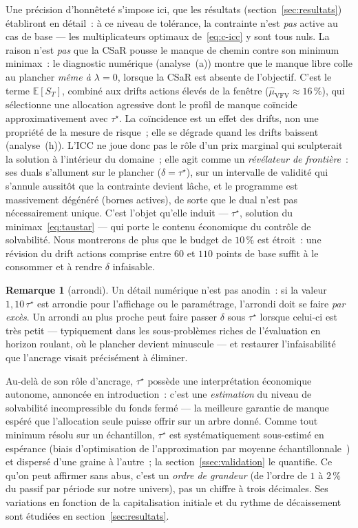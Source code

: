 \documentclass[11pt,letterpaper]{article}
\newcommand{\E}{\mathbb{E}}
\newcommand{\taustar}{\tau^{\star}}
\theoremstyle{definition}
\newtheorem{remarque}{Remarque}
\begin{document}
Une précision d'honnêteté s'impose ici, que les résultats
(section~\ref{sec:resultats}) établiront en détail~: à ce niveau de tolérance,
la contrainte n'est \emph{pas} active au cas de base --- les multiplicateurs
optimaux de~\eqref{eq:c-icc} y sont tous nuls. La raison n'est \emph{pas} que la
CSaR pousse le manque de chemin contre son minimum minimax~: le diagnostic
numérique (analyse~(a)) montre que le manque libre colle au plancher
\emph{même à $\lambda = 0$}, lorsque la CSaR est absente de l'objectif. C'est le
terme $\E[S_T]$, combiné aux drifts actions élevés de la fenêtre
($\hat\mu_{\mathrm{VFV}} \approx 16\,\%$), qui sélectionne une allocation
agressive dont le profil de manque coïncide approximativement avec $\taustar$.
La coïncidence est un effet des drifts, non une propriété de la mesure de risque~;
elle se dégrade quand les drifts baissent (analyse~(h)). L'ICC ne joue donc pas le
rôle d'un prix marginal qui sculpterait la solution à l'intérieur du domaine~; elle
agit comme un \emph{révélateur de frontière}~: ses duals s'allument sur le plancher
($\delta = \taustar$), sur un intervalle de validité qui s'annule aussitôt que la
contrainte devient lâche, et le programme est massivement dégénéré (bornes
actives), de sorte que le dual n'est pas nécessairement unique. C'est
l'objet qu'elle induit --- $\taustar$, solution du minimax~\eqref{eq:taustar} ---
qui porte le contenu économique du contrôle de solvabilité. Nous montrerons de plus
que le budget de $10\,\%$ est étroit~: une révision du drift actions comprise entre
$60$ et $110$ points de base suffit à le consommer et à rendre $\delta$ infaisable.

\begin{remarque}[arrondi]\label{rem:arrondi}
Un détail numérique n'est pas anodin~: si la valeur $1{,}10\,\taustar$ est
arrondie pour l'affichage ou le paramétrage, l'arrondi doit se faire \emph{par
excès}. Un arrondi au plus proche peut faire passer $\delta$ sous $\taustar$
lorsque celui-ci est très petit --- typiquement dans les sous-problèmes riches de
l'évaluation en horizon roulant, où le plancher devient minuscule --- et restaurer
l'infaisabilité que l'ancrage visait précisément à éliminer.
\end{remarque}

Au-delà de son rôle d'ancrage, $\taustar$ possède une interprétation économique
autonome, annoncée en introduction~: c'est une \emph{estimation} du niveau de
solvabilité incompressible du fonds fermé --- la meilleure garantie de manque
espéré que l'allocation seule puisse offrir sur un arbre donné. Comme tout
minimum résolu sur un échantillon, $\taustar$ est systématiquement sous-estimé
en espérance (biais d'optimisation de l'approximation par moyenne
échantillonnale~\cite{Mak1999,Shapiro2003}) et dispersé d'une graine à l'autre~;
la section~\ref{ssec:validation} le quantifie. Ce qu'on peut affirmer sans
abus, c'est un \emph{ordre de grandeur} (de l'ordre de $1$ à $2\,\%$ du passif
par période sur notre univers), pas un chiffre à trois décimales. Ses variations
en fonction de la capitalisation initiale et du rythme de décaissement sont
étudiées en section~\ref{sec:resultats}.
\end{document}
